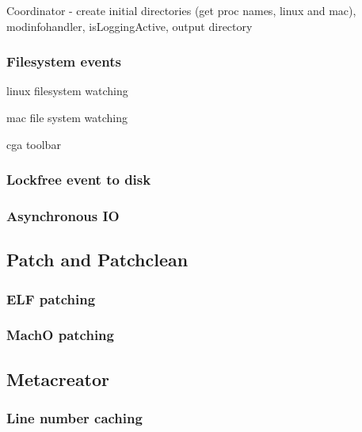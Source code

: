 Coordinator - create initial directories (get proc names, linux and mac), modinfohandler, isLoggingActive, output directory

\subsubsection{Filesystem events}

linux filesystem watching

mac file system watching

cga toolbar

\subsubsection{Lockfree event to disk} 

\subsubsection{Asynchronous IO}

\subsection{Patch and Patchclean} 

\subsubsection{ELF patching} 

\subsubsection{MachO patching}

\subsection{Metacreator} 

\subsubsection{Line number caching} 
